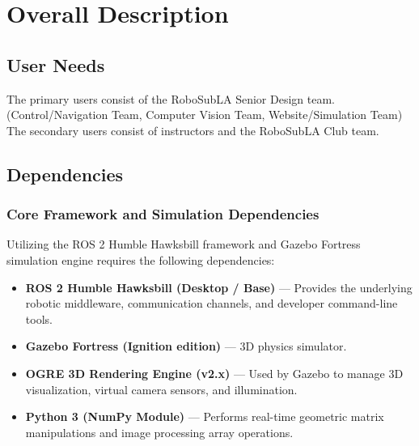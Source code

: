 \documentclass[12pt]{article}
\begin{document}
\newpage
\section{Overall Description} 

\subsection{User Needs} 
The primary users consist of the RoboSubLA Senior Design team. (Control/Navigation Team, Computer Vision Team, Website/Simulation Team)\\
The secondary users consist of instructors and the RoboSubLA Club team. 

\subsection{Dependencies} 
\subsubsection{Core Framework and Simulation Dependencies} 
Utilizing the ROS 2 Humble Hawksbill framework and Gazebo Fortress simulation engine requires the following dependencies: 
\begin{itemize} 
	\item \textbf{ROS 2 Humble Hawksbill (Desktop / Base)} — Provides the underlying robotic middleware, communication channels, and developer command-line tools. 
	 \item \textbf{Gazebo Fortress (Ignition edition)} — 3D physics simulator.
	\item \textbf{OGRE 3D Rendering Engine (v2.x)} — Used by Gazebo to manage 3D visualization, virtual camera sensors, and illumination.
	\item \textbf{Python 3 (NumPy Module)} —  Performs real-time geometric matrix manipulations and image processing array operations.
	\end{itemize} 
\end{document}
